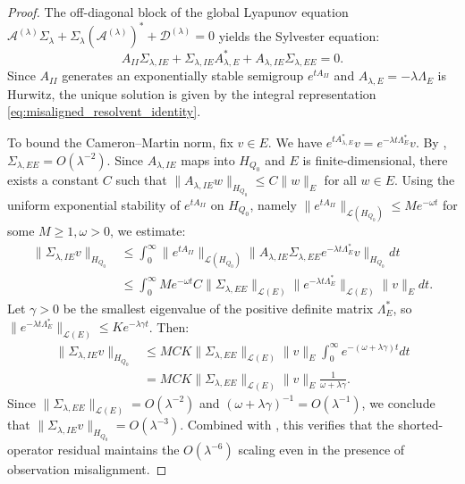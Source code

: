 \documentclass[11pt]{amsart}
\theoremstyle{plain}
\theoremstyle{definition}
\theoremstyle{remark}
\begin{document}
\begin{proof}
  The off-diagonal block of the global Lyapunov equation $\mathcal{A}^{(\lambda)} \Sigma_\lambda + \Sigma_\lambda (\mathcal{A}^{(\lambda)})^* + \mathcal{D}^{(\lambda)} = 0$ yields the Sylvester equation:
  \[
    A_{II} \Sigma_{\lambda,IE} + \Sigma_{\lambda,IE} A_{\lambda,E}^* + A_{\lambda,IE} \Sigma_{\lambda,EE} = 0.
  \]
  Since $A_{II}$ generates an exponentially stable semigroup $e^{t A_{II}}$ and $A_{\lambda,E} = -\lambda \Lambda_E$ is Hurwitz, the unique solution is given by the integral representation \eqref{eq:misaligned_resolvent_identity}.
  
  To bound the Cameron--Martin norm, fix $v \in E$. We have $e^{t A_{\lambda,E}^*} v = e^{-\lambda t \Lambda_E^*} v$. By , $\Sigma_{\lambda,EE} = O(\lambda^{-2})$. Since $A_{\lambda,IE}$ maps into $H_{Q_0}$ and $E$ is finite-dimensional, there exists a constant $C$ such that $\|A_{\lambda,IE} w\|_{H_{Q_0}} \le C \|w\|_E$ for all $w \in E$. Using the uniform exponential stability of $e^{t A_{II}}$ on $H_{Q_0}$, namely $\|e^{t A_{II}}\|_{\mathcal{L}(H_{Q_0})} \le M e^{-\omega t}$ for some $M \ge 1, \omega > 0$, we estimate:
  \begin{align*}
    \|\Sigma_{\lambda,IE} v\|_{H_{Q_0}} 
    &\le \int_0^\infty \|e^{t A_{II}}\|_{\mathcal{L}(H_{Q_0})} \|A_{\lambda,IE} \Sigma_{\lambda,EE} e^{-\lambda t \Lambda_E^*} v\|_{H_{Q_0}} dt \\
    &\le \int_0^\infty M e^{-\omega t} C \|\Sigma_{\lambda,EE}\|_{\mathcal{L}(E)} \|e^{-\lambda t \Lambda_E^*}\|_{\mathcal{L}(E)} \|v\|_E dt.
  \end{align*}
  Let $\gamma > 0$ be the smallest eigenvalue of the positive definite matrix $\Lambda_E^*$, so $\|e^{-\lambda t \Lambda_E^*}\|_{\mathcal{L}(E)} \le K e^{-\lambda \gamma t}$. Then:
  \begin{align*}
    \|\Sigma_{\lambda,IE} v\|_{H_{Q_0}} 
    &\le M C K \|\Sigma_{\lambda,EE}\|_{\mathcal{L}(E)} \|v\|_E \int_0^\infty e^{-(\omega + \lambda \gamma) t} dt \\
    &= M C K \|\Sigma_{\lambda,EE}\|_{\mathcal{L}(E)} \|v\|_E \frac{1}{\omega + \lambda \gamma}.
  \end{align*}
  Since $\|\Sigma_{\lambda,EE}\|_{\mathcal{L}(E)} = O(\lambda^{-2})$ and $(\omega + \lambda \gamma)^{-1} = O(\lambda^{-1})$, we conclude that $\|\Sigma_{\lambda,IE} v\|_{H_{Q_0}} = O(\lambda^{-3})$. Combined with , this verifies that the shorted-operator residual maintains the $O(\lambda^{-6})$ scaling even in the presence of observation misalignment.
\end{proof}
\end{document}
